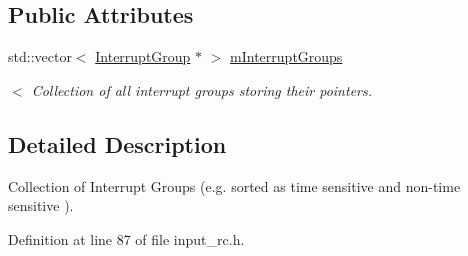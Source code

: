\subsection*{Public Attributes}
\begin{DoxyCompactItemize}
\item 
std\+::vector$<$ \hyperlink{classSPMB_1_1InterruptGroup}{Interrupt\+Group} $\ast$ $>$ \hyperlink{classSPMB_1_1InterruptManager_a103e2348c57eecaab0605c196f3b924b}{m\+Interrupt\+Groups}\hypertarget{classSPMB_1_1InterruptManager_a103e2348c57eecaab0605c196f3b924b}{}\label{classSPMB_1_1InterruptManager_a103e2348c57eecaab0605c196f3b924b}

\begin{DoxyCompactList}\small\item\em $<$ Collection of all interrupt groups storing their pointers. \end{DoxyCompactList}\end{DoxyCompactItemize}


\subsection{Detailed Description}
Collection of Interrupt Groups (e.\+g. sorted as time sensitive and non-\/time sensitive ). 

Definition at line 87 of file input\+\_\+rc.\+h.

